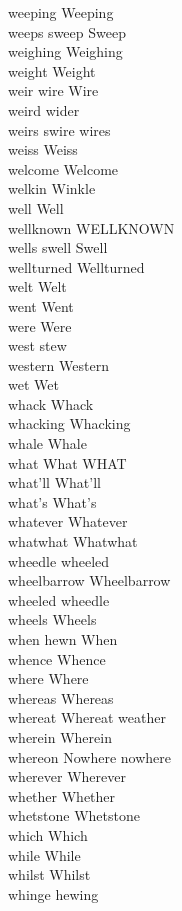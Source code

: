 weeping Weeping\\
weeps sweep Sweep\\
weighing Weighing\\
weight Weight\\
weir wire Wire\\
weird wider\\
weirs swire wires\\
weiss Weiss\\
welcome Welcome\\
welkin Winkle\\
well Well\\
wellknown WELLKNOWN\\
wells swell Swell\\
wellturned Wellturned\\
welt Welt\\
went Went\\
were Were\\
west stew\\
western Western\\
wet Wet\\
whack Whack\\
whacking Whacking\\
whale Whale\\
what What WHAT\\
what'll What'll\\
what's What's\\
whatever Whatever\\
whatwhat Whatwhat\\
wheedle wheeled\\
wheelbarrow Wheelbarrow\\
wheeled wheedle\\
wheels Wheels\\
when hewn When\\
whence Whence\\
where Where\\
whereas Whereas\\
whereat Whereat weather\\
wherein Wherein\\
whereon Nowhere nowhere\\
wherever Wherever\\
whether Whether\\
whetstone Whetstone\\
which Which\\
while While\\
whilst Whilst\\
whinge hewing\\
